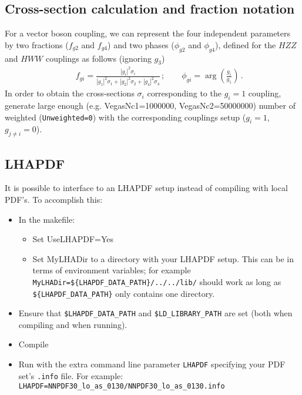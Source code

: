 \documentclass[aps,superscriptaddress,nofootinbib]{revtex4}
\begin{document}
\subsection{Cross-section calculation and fraction notation}
For a vector boson coupling, we can represent the four independent parameters by two  fractions
($f_{g2}$ and $f_{g4}$) and two phases ($\phi_{g2}$ and $\phi_{g4}$), defined for the $HZZ$
and $HWW$ couplings as follows (ignoring $g_3$)
%
\begin{eqnarray}
&& f_{gi} =  \frac{|g^{}_{i}|^2\sigma_i}{|g^{}_{1}|^2\sigma_1+|g^{}_{2}|^2\sigma_2+|g^{}_{4}|^2\sigma_4}\,;
~~~~~~~~~
 \phi_{gi} = \arg\left(\frac{g_i}{g_1}\right)\,.
\nonumber
\label{eq:fractions}
\end{eqnarray}
%
In order to obtain the cross-sections $\sigma_i$ corresponding to the $g^{}_{i}=1$ coupling,
generate large enough (e.g. VegasNc1=1000000, VegasNc2=50000000) number of weighted
({\tt Unweighted=0}) with the corresponding couplings setup ($g^{}_{i}=1$, $g^{}_{j\ne i}=0$).
\subsection{LHAPDF}
\label{sec:LHAPDF}
It is possible to interface to an LHAPDF setup instead of compiling with local PDF's.  To accomplish this:
\begin{itemize}
\item In the makefile:
\begin{itemize}
\item Set UseLHAPDF=Yes
\item Set MyLHADir to a directory with your LHAPDF setup.  This can be in terms of environment variables; for example \verb|MyLHADir=${LHAPDF_DATA_PATH}/../../lib/| should work as long as \verb|${LHAPDF_DATA_PATH}| only contains one directory.
\end{itemize}
\item Ensure that \verb|$LHAPDF_DATA_PATH| and \verb|$LD_LIBRARY_PATH| are set (both when compiling and when running).
\item Compile
\item Run with the extra command line parameter \verb|LHAPDF| specifying your PDF set's \verb|.info| file.  For example: \verb|LHAPDF=NNPDF30_lo_as_0130/NNPDF30_lo_as_0130.info|
\end{itemize}
\end{document}
